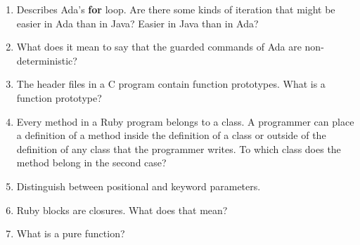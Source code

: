 \begin{enumerate}
\begin{answer}
  \end{answer}

  \item Describes Ada's \textbf{for} loop. Are there some
    kinds of iteration that might be easier in Ada than
    in Java? Easier in Java than in Ada?

  \begin{answer}
   
  \end{answer}

  \item What does it mean to say that the guarded commands
    of Ada are non-deterministic?

  \begin{answer}
   
  \end{answer}

  \item The header files in a C program contain function
    prototypes. What is a function prototype?

  \begin{answer}
   
  \end{answer}

  \item Every method in a Ruby program belongs to a class.
    A programmer can place a definition of a method inside
    the definition of a class or outside of the definition
    of any class that the programmer writes. To which class
    does the method belong in the second case?

  \begin{answer}
   
  \end{answer}

  \item Distinguish between positional and keyword parameters.

  \begin{answer}
   
  \end{answer}

  \item Ruby blocks are closures. What does that mean?

  \begin{answer}
   
  \end{answer}

  \item What is a pure function?


\end{enumerate}
